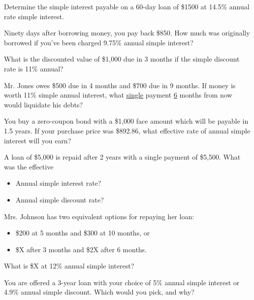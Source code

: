 \documentclass[addpoints, 12pt]{exam}
\begin{document}
\begin{questions}

    \question Determine the simple interest payable on a 60-day loan of \$1500 at 14.5\% annual rate
    simple interest.
    \vspace{2in}

    \question Ninety days after borrowing money, you pay back \$850.  How much was originally borrowed
    if you've been charged 9.75\% annual simple interest?
    \vspace{2in}

    \question What is the discounted value of \$1,000 due in 3 months if the simple discount rate is
    11\% annual?
    \vspace{2in}

    \question Mr. Jones owes \$500 due in 4 months and \$700 due in 9 months.  If money is worth
    11\% simple annual interest, what \underline{single} payment \underline{6}  months from now would liquidate his debts?
    \vspace{2in}

    \question You buy a zero-coupon bond with a \$1,000 face amount which will be payable in
    1.5 years.
    If your purchase price was \$892.86, what effective rate of annual simple interest will you earn?
    \vspace{1.5in}

    \question A loan of \$5,000 is repaid after 2 years with a single payment of \$5,500.
    What was the effective
    \begin{itemize}
        \item Annual simple interest rate?
        \item Annual simple discount rate?
    \end{itemize}
    \vspace{1.5in}

    \question Mrs. Johnson has two equivalent options for repaying her loan:
    \begin{itemize}
        \item \$200 at 5 months and \$300 at 10 months, or
        \item \$X after 3 months and \$2X after 6 months.
    \end{itemize}
    What is \$X at 12\% annual simple interest?
    \vspace{1.5in}

    \question You are offered a 3-year loan with your choice of 5\% annual simple interest or
    4.9\% annual simple discount.  Which would you pick, and why?

\end{questions}
\end{document}

